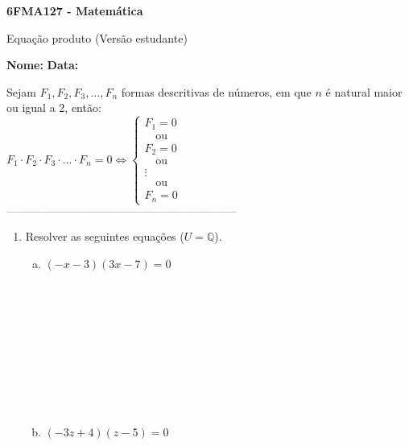 \documentclass[a4paper,14pt]{article}
\begin{document}
	
	\noindent\textbf{6FMA127 - Matemática} 
	
	\begin{center}Equação produto (Versão estudante)
	\end{center}
	
	\noindent\textbf{Nome:} \underline{\hspace{10cm}}
	\noindent\textbf{Data:} \underline{\hspace{4cm}}
	
	
	\begin{multicols}{2}
	    \noindent Sejam $F_1, F_2, F_3, ..., F_n$ formas descritivas de números, em que $n$ é natural maior ou igual a 2, então: \\
	    $F_1 \cdot F_2 \cdot F_3 \cdot ... \cdot F_n = 0 \Leftrightarrow \begin{cases} 
	    F_1 = 0 \\
	    \text{~~~ou} \\
	    F_2 = 0 \\
	    \text{~~~ou} \\
	    \vdots \\
	    \text{~~~ou} \\
	    F_n = 0
	    \end{cases}$
		\noindent\textsubscript{--------------------------------------------------------------------------}
		\begin{enumerate} 
			\item Resolver as seguintes equações ($U = \mathbb{Q}$).
			\begin{enumerate}[a)]
			\item $(-x - 3)(3x - 7) = 0$ \\\\\\\\\\\\\\\\\\\\
			\item $(-3z + 4)(z - 5) = 0$ \\\\\\\\\\\\\\\\\\\\

\end{enumerate}
\end{enumerate}
\end{multicols}
\end{document}
